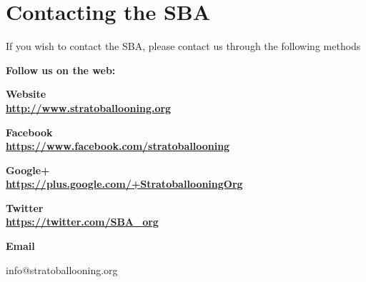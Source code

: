 \documentclass[10pt,foldmark,notumble]{leaflet}
\begin{document}
\section{Contacting the SBA}
If you wish to contact the SBA, please contact us through the following methods

\begin{center}
\vspace{0.2cm}
{\large \bf Follow us on the web: }

\bf Website\ \\ \url{http://www.stratoballooning.org}

\bf Facebook\ \\ \url{https://www.facebook.com/stratoballooning}

\bf Google+\ \\ \url{https://plus.google.com/+StratoballooningOrg}

\bf Twitter\ \\ \url{https://twitter.com/SBA_org}

\vspace{0.2cm}
{\bf Email}

info@stratoballooning.org

\vspace{0.2cm}


\end{center}
\end{document}
